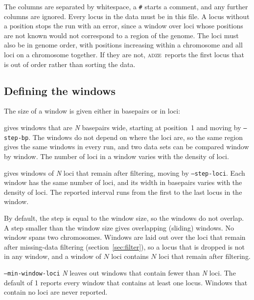 \documentclass[11pt]{article}
\newcommand{\prog}{\textsc{adze}}
\newcommand{\flag}[1]{\texttt{#1}}
\begin{document}
\noindent The columns are separated by whitespace, a \texttt{\#} starts a
comment, and any further columns are ignored. Every locus in the data must be
in this file. A locus without a position stops the run with an error, since a
window over loci whose positions are not known would not correspond to a
region of the genome. The loci must also be in genome order, with positions
increasing within a chromosome and all loci on a chromosome together. If they
are not, \prog\ reports the first locus that is out of order rather than
sorting the data.

\subsection{Defining the windows}

The size of a window is given either in basepairs or in loci:

\begin{description}[leftmargin=2em,style=nextline]
\item[\flag{--window-bp} \textit{N}] gives windows that are \textit{N}
  basepairs wide, starting at position~1 and moving by \flag{--step-bp}. The
  windows do not depend on where the loci are, so the same region gives the
  same windows in every run, and two data sets can be compared window by
  window. The number of loci in a window varies with the density of loci.
\item[\flag{--window-loci} \textit{N}] gives windows of \textit{N} loci that
  remain after filtering, moving by \flag{--step-loci}. Each window has the
  same number of loci, and its width in basepairs varies with the density of
  loci. The reported interval runs from the first to the last locus in the
  window.
\end{description}

\noindent By default, the step is equal to the window size, so the windows do
not overlap. A step smaller than the window size gives overlapping (sliding)
windows. No window spans two chromosomes. Windows are laid out over the loci
that remain after missing-data filtering (section~\ref{sec:filter}), so a
locus that is dropped is not in any window, and a window of $N$ loci
contains $N$ loci that remain after filtering.

\flag{--min-window-loci} \textit{N} leaves out windows that contain fewer than
\textit{N} loci. The default of 1 reports every window that contains at least
one locus. Windows that contain no loci are never reported.
\end{document}
